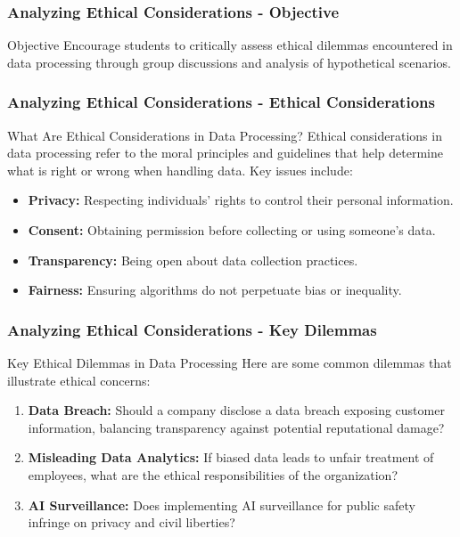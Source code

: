 \documentclass[aspectratio=169]{beamer}
\begin{document}
\begin{frame}[fragile]
    \frametitle{Analyzing Ethical Considerations - Objective}
    \begin{block}{Objective}
        Encourage students to critically assess ethical dilemmas encountered in data processing through group discussions and analysis of hypothetical scenarios.
    \end{block}
\end{frame}

\begin{frame}[fragile]
    \frametitle{Analyzing Ethical Considerations - Ethical Considerations}
    \begin{block}{What Are Ethical Considerations in Data Processing?}
        Ethical considerations in data processing refer to the moral principles and guidelines that help determine what is right or wrong when handling data. Key issues include:
    \end{block}
    \begin{itemize}
        \item \textbf{Privacy:} Respecting individuals' rights to control their personal information.
        \item \textbf{Consent:} Obtaining permission before collecting or using someone's data.
        \item \textbf{Transparency:} Being open about data collection practices.
        \item \textbf{Fairness:} Ensuring algorithms do not perpetuate bias or inequality.
    \end{itemize}
\end{frame}

\begin{frame}[fragile]
    \frametitle{Analyzing Ethical Considerations - Key Dilemmas}
    \begin{block}{Key Ethical Dilemmas in Data Processing}
        Here are some common dilemmas that illustrate ethical concerns:
    \end{block}
    \begin{enumerate}
        \item \textbf{Data Breach:} Should a company disclose a data breach exposing customer information, balancing transparency against potential reputational damage?
        \item \textbf{Misleading Data Analytics:} If biased data leads to unfair treatment of employees, what are the ethical responsibilities of the organization?
        \item \textbf{AI Surveillance:} Does implementing AI surveillance for public safety infringe on privacy and civil liberties?
    \end{enumerate}
\end{frame}
\end{document}
